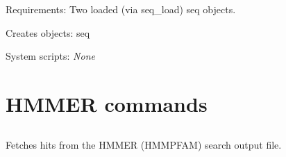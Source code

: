\begin{description}
\begin{enumerate}
\end{enumerate}


\item{Requirements:} Two loaded (via seq\_load) seq objects.


\item{Creates objects:} seq


\item{System scripts:} {\em None}

\end{description}



\section{HMMER commands}


\subsection[hmm\_score]{  }



Fetches hits from the HMMER (HMMPFAM) search output file.


